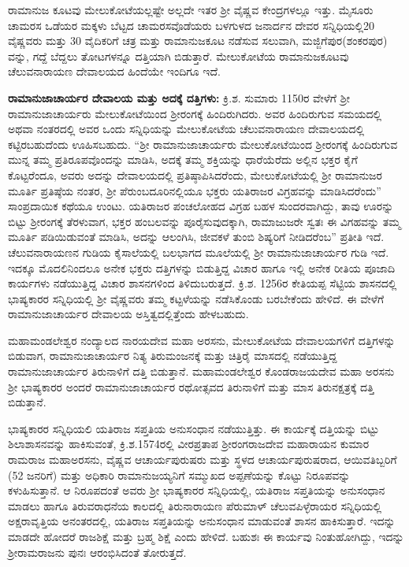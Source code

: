 ರಾಮಾನುಜ ಕೂಟವು ಮೇಲುಕೋಟೆಯಲ್ಲಷ್ಟೇ ಅಲ್ಲದೇ ಇತರ ಶ‍್ರೀ ವೈಷ್ಣವ ಕೇಂದ್ರಗಳಲ್ಲೂ ಇತ್ತು. ಮೈಸೂರು ಚಾಮರಸ ಒಡೆಯರ ಮಕ್ಕಳು ಬೆಟ್ಟದ ಚಾಮರಸವೊಡೆಯರು ಬಳಗುಳದ ಜನಾರ್ದನ ದೇವರ ಸನ್ನಿಧಿಯಲ್ಲಿ20 ವೈಷ್ಣವರು ಮತ್ತು 30 ವೈದಿಕರಿಗೆ ಚತ್ರ ಮತ್ತು ರಾಮಾನುಜಕೂಟ ನಡೆಸುವ ಸಲುವಾಗಿ, ಮಜ್ಜಿಗೆಪುರ(ಶಂಕರಪುರ) ವನ್ನು, ಗದ್ದೆ ಬೆದ್ದಲು ತೋಟಗಳನ್ನೂ ದತ್ತಿಯಾಗಿ ಬಿಡುತ್ತಾರೆ. ಮೇಲುಕೋಟೆಯ ರಾಮಾನುಜಕೂಟವು ಚೆಲುವನಾರಾಯಣ ದೇವಾಲಯದ ಹಿಂದೆಯೇ ಇಂದಿಗೂ ಇದೆ.

\textbf{ರಾಮಾನುಜಾಚಾರ್ಯರ ದೇವಾಲಯ ಮತ್ತು ಅದಕ್ಕೆ ದತ್ತಿಗಳು:} ಕ್ರಿ.ಶ. ಸುಮಾರು 1150ರ ವೇಳೆಗೆ ಶ‍್ರೀ ರಾಮಾನುಜಾಚಾರ್ಯರು ಮೇಲುಕೋಟೆಯಿಂದ ಶ‍್ರೀರಂಗಕ್ಕೆ ಹಿಂದಿರುಗಿದರು. ಅವರ ಹಿಂದಿರುಗುವ ಸಮಯದಲ್ಲಿ ಅಥವಾ ನಂತರದಲ್ಲಿ ಅವರ ಒಂದು ಸನ್ನಿಧಿಯನ್ನು ಮೇಲುಕೋಟೆಯ ಚೆಲುವನಾರಾಯಣ ದೇವಾಲಯದಲ್ಲಿ ಕಟ್ಟಿರಬಹುದೆಂದು ಊಹಿಸಬಹುದು. “ಶ‍್ರೀ ರಾಮಾನುಜಾಚಾರ್ಯರು ಮೇಲುಕೋಟೆಯಿಂದ ಶ‍್ರೀರಂಗಕ್ಕೆ ಹಿಂದಿರುಗುವ ಮುನ್ನ ತಮ್ಮ ಪ್ರತಿರೂಪವೊಂದನ್ನು ಮಾಡಿಸಿ, ಅದಕ್ಕೆ ತಮ್ಮ ಶಕ್ತಿಯನ್ನು ಧಾರೆಯೆರೆದು ಅಲ್ಲಿನ ಭಕ್ತರ ಕೈಗೆ ಕೊಟ್ಟರೆಂದೂ, ಅವರು ಅದನ್ನು ದೇವಾಲಯದಲ್ಲಿ ಪ್ರತಿಷ್ಠಾಪಿಸಿದರೆಂದು, ಮೇಲುಕೋಟೆಯಲ್ಲಿ ಶ‍್ರೀ ರಾಮಾನುಜರ ಮೂರ್ತಿ ಪ್ರತಿಷ್ಠೆಯ ನಂತರ, ಶ‍್ರೀ ಪೆರುಂಬದೂರಿನಲ್ಲಿಯೂ ಭಕ್ತರು ಯತಿರಾಜರ ವಿಗ್ರಹವನ್ನು ಮಾಡಿಸಿದರೆಂದು” ಸಾಂಪ್ರದಾಯಿಕ ಕಥೆಯೂ ಉಂಟು. ಯತಿರಾಜರ ಪಂಚಲೋಹದ ವಿಗ್ರಹ ಬಹಳ ಸುಂದರವಾಗಿದ್ದು, ತಾವು ಊರನ್ನು ಬಿಟ್ಟು ಶ‍್ರೀರಂಗಕ್ಕೆ ತೆರಳುವಾಗ, ಭಕ್ತರ ಹಂಬಲವನ್ನು ಪೂರೈಸುವುದಕ್ಕಾಗಿ, ರಾಮಾಜುಜರೇ ಸ್ವತಃ ಈ ವಿಗಹವನ್ನು ತಮ್ಮ ಮೂರ್ತಿ ಪಡಿಯಿಡುವಂತೆ ಮಾಡಿಸಿ, ಅದನ್ನು ಆಲಂಗಿಸಿ, ಜೀವಕಳೆ ತುಂಬಿ ಶಿಷ್ಯರಿಗೆ ನೀಡಿದರೆಂಬ” ಪ್ರತೀತಿ ಇದೆ. ಚೆಲುವನಾರಾಯಣನ ಗುಡಿಯ ಕೈಸಾಲೆಯಲ್ಲಿ ಬಲಭಾಗದ ಮೂಲೆಯಲ್ಲಿ ಶ‍್ರೀ ರಾಮಾನುಜಾಚಾರ್ಯರ ಗುಡಿ ಇದೆ. ಇದಕ್ಕೂ ಮೊದಲಿನಿಂದಲೂ ಅನೇಕ ಭಕ್ತರು ದತ್ತಿಗಳನ್ನು ಬಿಡುತ್ತಿದ್ದ ವಿಚಾರ ಹಾಗೂ ಇಲ್ಲಿ ಅನೇಕ ರೀತಿಯ ಪೂಜಾದಿ ಕಾರ್ಯಗಳು ನಡೆಯುತ್ತಿದ್ದ ವಿಚಾರ ಶಾಸನಗಳಿಂದ ತಿಳಿದುಬರುತ್ತದೆ. ಕ್ರಿ.ಶ. 1256ರ ಕೇತಿಯಪ್ಪ ಸೆಟ್ಟಿಯ ಶಾಸನದಲ್ಲಿ ಭಾಷ್ಯಕಾರರ ಸನ್ನಿಧಿಯಲ್ಲಿ ಶ‍್ರೀ ವೈಷ್ಣವರು ತಮ್ಮ ಕಟ್ಟಳೆಯನ್ನು ನಡೆಸಿಕೊಂಡು ಬರಬೇಕೆಂದು ಹೇಳಿದೆ. ಈ ವೇಳೆಗೆ ರಾಮಾನುಜಾಚಾರ್ಯರ ದೇವಾಲಯ ಅಸ್ತಿತ್ವದಲ್ಲಿತ್ತೆಂದು ಹೇಳಬಹುದು.

ಮಹಾಮಂಡಲೇಶ್ವರ ನಂದ್ಯಾಲದ ನಾರಯದೇವ ಮಹಾ ಅರಸನು, ಮೇಲುಕೋಟೆಯ ದೇವಾಲಯಗಳಿಗೆ ದತ್ತಿಗಳನ್ನು ಬಿಡುವಾಗ, ರಾಮಾನುಜಾಚಾರ್ಯರ ನಿತ್ಯ ತಿರುಮಂಜನಕ್ಕೆ ಮತ್ತು ಚಿತ್ರಿರೈ ಮಾಸದಲ್ಲಿ ನಡೆಯುತ್ತಿದ್ದ ರಾಮಾನುಜಾಚಾರ್ಯರ ತಿರುನಾಳಿಗೆ ದತ್ತಿ ಬಿಡುತ್ತಾನೆ. ಮಹಾಮಂಡಲೇಶ್ವರ ಕೊಂಡರಾಜಯದೇವ ಮಹಾ ಅರಸನು ಶ‍್ರೀ ಭಾಷ್ಯಕಾರರ ಅಂದರೆ ರಾಮಾನುಜಾಚಾರ್ಯರ ರಥೋತ್ಸವದ ತಿರುನಾಳಿಗೆ ಮತ್ತು ಮಾಸ ತಿರುನಕ್ಷತ್ರಕ್ಕೆ ದತ್ತಿ ಬಿಡುತ್ತಾನೆ.

ಭಾಷ್ಯಕಾರರ ಸನ್ನಿಧಿಯಲಿ ಯತಿರಾಜ ಸಪ್ತತಿಯ ಅನುಸಂಧಾನ ನಡೆಯುತ್ತಿತ್ತು. ಈ ಕಾರ್ಯಕ್ಕೆ ದತ್ತಿಯನ್ನು ಬಿಟ್ಟು ಶಿಲಾಶಾಸನವನ್ನು ಹಾಕಿಸುವಂತೆ, ಕ್ರಿ.ಶ.1574ರಲ್ಲಿ ವೀರಪ್ರತಾಪ ಶ‍್ರೀರಂಗರಾಜದೇವ ಮಹಾರಾಯನ ಕುಮಾರ ರಾಮರಾಜ ಮಹಾಅರಸನು, ವೈಷ್ಣವ ಆಚಾರ್ಯಪುರುಷರು ಮತ್ತು ಸ್ಥಳದ ಆಚಾರ್ಯಪುರುಷರಾದ, ಆಯಿವತಿಬ್ಬರಿಗೆ (52 ಜನರಿಗೆ) ಮತ್ತು ಅಧಿಕಾರಿ ರಾಮಾನುಜಯ್ಯನಿಗೆ ಸಮ್ಮುಖದ ಅಪ್ಪಣೆಯನ್ನು ಕೊಟ್ಟು ನಿರೂಪವನ್ನು ಕಳುಹಿಸುತ್ತಾನೆ. ಆ ನಿರೂಪದಂತೆ ಅವರು ಶ‍್ರೀ ಭಾಷ್ಯಕಾರರ ಸನ್ನಿಧಿಯಲ್ಲಿ, ಯತಿರಾಜ ಸಪ್ತತಿಯನ್ನು ಅನುಸಂಧಾನ ಮಾಡಲು ಹಾಗೂ ತಿರುವರಾಧನೆಯ ಕಾಲದಲ್ಲಿ ತಿರುನಾರಾಯಣ ಪೆರುಮಾಳ್​ ಚೆಲುವಪಿಳ್ಳೆರಾಯರ ಸನ್ನಿಧಿಯಲ್ಲಿ ಅಕ್ಷರಾವೃತ್ತಿಯ ಅನಂತರದಲ್ಲಿ, ಯತಿರಾಜ ಸಪ್ತತಿಯನ್ನು ಅನುಸಂಧಾನ ಮಾಡುವಂತೆ ಶಾಸನ ಹಾಕಿಸುತ್ತಾರೆ. ಇದನ್ನು ಮಾಡದೇ ಹೋದರೆ ರಾಜಶಿಕ್ಷೆ ಮತ್ತು ಬ್ರಹ್ಮ ಶಿಕ್ಷೆ ಎಂದು ಹೇಳಿದೆ. ಬಹುಶಃ ಈ ಕಾರ್ಯವು ನಿಂತುಹೋಗಿದ್ದು, ಇದನ್ನು ಶ‍್ರೀರಾಮರಾಜನು ಪುನಃ ಆರಂಭಿಸಿದಂತೆ ತೋರುತ್ತದೆ.

